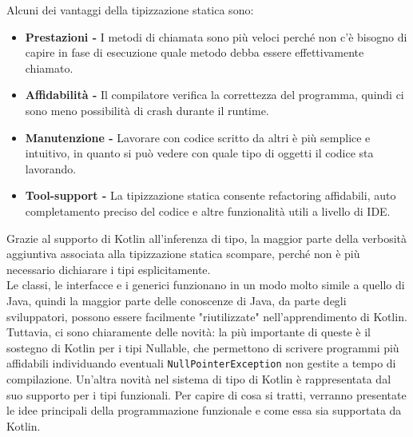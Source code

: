 Alcuni dei vantaggi della tipizzazione statica sono:
\begin{itemize}
  \item {\bfseries Prestazioni -} I metodi di chiamata sono più veloci perché non c'è bisogno di capire in fase
        di esecuzione quale metodo debba essere effettivamente chiamato.
  \item {\bfseries Affidabilità -} Il compilatore verifica la correttezza del programma, quindi ci sono meno
        possibilità di crash durante il runtime.
  \item {\bfseries Manutenzione -} Lavorare con codice scritto da altri è più semplice e intuitivo, in quanto
        si può vedere con quale tipo di oggetti il codice sta lavorando.
  \item {\bfseries Tool-support -} La tipizzazione statica consente refactoring affidabili, auto completamento
        preciso del codice e altre funzionalità utili a livello di IDE.
\end{itemize}
Grazie al supporto di Kotlin all'inferenza di tipo, la maggior parte della verbosità aggiuntiva associata
alla tipizzazione statica scompare, perché non è più necessario dichiarare i tipi esplicitamente.\\
Le classi, le interfacce e i generici funzionano in un modo molto simile a quello di Java, quindi la
maggior parte delle conoscenze di Java, da parte degli sviluppatori, possono essere facilmente "riutilizzate"
nell’apprendimento di Kotlin. Tuttavia, ci sono chiaramente delle novità: la più importante di queste è il sostegno
di Kotlin per i tipi Nullable, che permettono di scrivere programmi più affidabili individuando eventuali
\texttt{NullPointerException} non gestite a tempo di compilazione. Un'altra novità nel sistema di tipo di Kotlin è rappresentata
dal suo supporto per i tipi funzionali. Per capire di cosa si tratti, verranno presentate le idee principali
della programmazione funzionale e come essa sia supportata da Kotlin.\\

